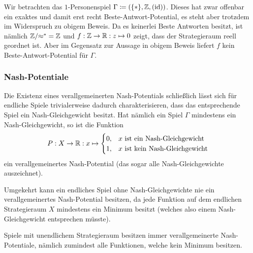 \begin{bsp}
	Wir betrachten das $1$-Personenspiel $\Gamma \coloneqq (\{\ast\}, \mathbb{Z}, (\mathrm{id}))$. Dieses hat zwar offenbar ein exaktes und damit erst recht Beste-Antwort-Potential, es steht aber trotzdem im Widerspruch zu obigem Beweis. Da es keinerlei Beste Antworten besitzt, ist nämlich $\mathbb{Z}/{\approx^\ast} = \mathbb{Z}$ und $f: \mathbb{Z} \to \mathbb{R}: z \mapsto 0$ zeigt, dass der Strategieraum reell geordnet ist. Aber im Gegensatz zur Aussage in obigem Beweis liefert $f$ kein Beste-Antwort-Potential für $\Gamma$.
\end{bsp}


\subsubsection{Nash-Potentiale}


Die Existenz eines verallgemeinerten Nash-Potentials schließlich lässt sich für endliche Spiele trivialerweise dadurch charakterisieren, dass das entsprechende Spiel ein Nash-Gleichgewicht besitzt. Hat nämlich ein Spiel $\Gamma$ mindestens ein Nash-Gleichgewicht, so ist die Funktion
	\[P: X \to \mathbb{R}: x \mapsto \begin{cases}0, &x \text{ ist ein Nash-Gleichgewicht} \\ 1, &x \text{ ist kein Nash-Gleichgewicht}\end{cases} \]
ein verallgemeinertes Nash-Potential (das sogar alle Nash-Gleichgewichte auszeichnet).

Umgekehrt kann ein endliches Spiel ohne Nash-Gleichgewichte nie ein verallgemeinertes Nash-Potential besitzen, da jede Funktion auf dem endlichen Strategieraum $X$ mindestens ein Minimum besitzt (welches also einem Nash-Gleichgewicht entsprechen müsste).

Spiele mit unendlichem Strategieraum besitzen immer verallgemeinerte Nash-Potentiale, nämlich zumindest alle Funktionen, welche kein Minimum besitzen.
	